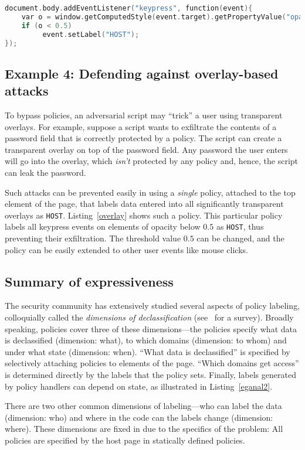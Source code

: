 \begin{lstlisting}[float, caption=Example policy to prevent overlay-based
  stealing of keystrokes,label=overlay,language=C]
document.body.addEventListener("keypress", function(event){
    var o = window.getComputedStyle(event.target).getPropertyValue("opacity");
    if (o < 0.5) 
         event.setLabel("HOST");
});
\end{lstlisting}

\subsection{Example 4: Defending against overlay-based attacks}
To bypass {\sys} policies, an adversarial script may ``trick'' a user
using transparent overlays. For example, suppose a script wants to
exfiltrate the contents of a password field that is correctly
protected by a {\sys} policy. The script can create a transparent
overlay on top of the password field. Any password the user enters
will go into the overlay, which \emph{isn't} protected by any policy
and, hence, the script can leak the password.

Such attacks can be prevented easily in {\sys} using a \emph{single}
policy, attached to the top element of the page, that labels data
entered into all significantly transparent overlays as
\texttt{HOST}. Listing~\ref{overlay} shows such a policy. This
particular policy labels all keypress events on elements of opacity
below $0.5$ as \texttt{HOST}, thus preventing their exfiltration. The
threshold value $0.5$ can be changed, and the policy can be easily
extended to other user events like mouse clicks.

\subsection{Summary of {\sys} expressiveness} 
The security community has extensively studied several
aspects of policy labeling, colloquially called the \emph{dimensions
  of declassification} (see~\cite{dimDecl} for a survey). Broadly
speaking, {\sys} policies cover three of these dimensions---the
policies specify what data is declassified (dimension: what), to which
domains (dimension: to whom) and under what state (dimension:
when). ``What data is declassified'' is specified by selectively
attaching policies to elements of the page. ``Which domains get
access'' is determined directly by the labels that the policy
sets. Finally, labels generated by policy handlers can depend on
state, as illustrated in Listing~\ref{eganal2}.

There are two other common dimensions of labeling---who can label the
data (dimension: who) and where in the code can the labels change
(dimension: where). These dimensions are fixed in {\sys} due to the
specifics of the problem: All policies are specified by the host page
in statically defined policies.

